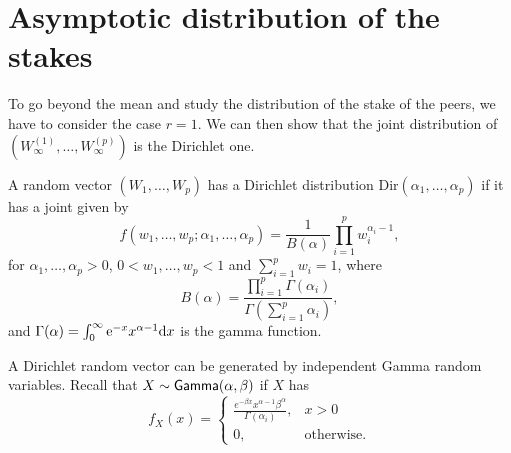 \section{Asymptotic distribution of the stakes}\label{ssec:stakes_distribution}
To go beyond the mean and study the distribution of the stake of the peers, we have to consider the case $r = 1$. We can then show that the joint distribution of $(W_\infty^{(1)},\ldots,  W_\infty^{(p)})$ is the Dirichlet one. 
\begin{definition}\label{def:dirichlet}
A random vector $(W_1,\ldots, W_p)$ has a Dirichlet distribution $\text{Dir}(\alpha_1,\ldots, \alpha_p)$ if it has a joint \pdf given by 
\begin{equation}\label{eq:dirichlet_pdf}
f(w_1,\ldots, w_p;\alpha_1,\ldots, \alpha_p) = \frac{1}{B(\alpha)}\prod_{i=1}^p w_i^{\alpha_i-1}, 
\end{equation}
for $\alpha_1,\ldots, \alpha_p>0$, $0< w_1,\ldots, w_p <1$ and $\sum_{i=1}^pw_i=1$, where 
$$
B(\alpha) = \frac{\prod_{i = 1}^p \Gamma(\alpha_i)}{\Gamma(\sum_{i=1}^p \alpha_i)},
$$
and $\Gamma(\alpha) = \int_{0}^{\infty}\mathrm{e}^{-x}x^{\alpha-1}\text{d}x$ is the gamma function.
\end{definition}
\noindent A Dirichlet random vector can be generated by independent Gamma random variables. Recall that $X\sim\mathsf{Gamma}(\alpha, \beta)$ if $X$ has \pdf
\begin{equation}\label{eq:gamma_pdf}
f_{X}(x) = \begin{cases}
\frac{e^{-\beta x}x^{\alpha-1}\beta^\alpha}{\Gamma(\alpha_i)},&
x>0\\
0,&\text{otherwise}.\end{cases}
\end{equation}

